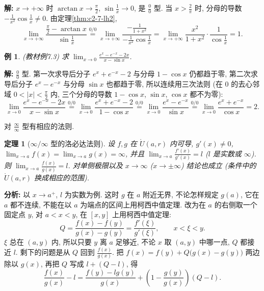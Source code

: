 \documentclass[UTF8,openany]{ctexbook}
\theoremstyle{chinesetextbook}
\newtheorem{example}{例}[section]
\newtheorem{theorem}{定理}[section]
\newenvironment{cnsolution}{\par\indent\textbf{解:} \ignorespaces}{\par}
\begin{document}
\begin{cnsolution}
$x\to+\infty$ 时 $\displaystyle\arctan x\to\frac\pi2$, $\displaystyle\sin\frac1x\to0$, 是 $\displaystyle\frac00$ 型. 当 $\displaystyle x>\frac2\pi$ 时, 分母的导数 $\displaystyle-\frac1{x^2}\cos\frac1x\ne0$. 由定理\ref{thm:c2-7-lh2},
\[
\lim_{x\to+\infty}\frac{\frac\pi2-\arctan x}{\sin\frac1x}\overset{0/0}{=}\lim_{x\to+\infty}\frac{-\frac1{1+x^2}}{-\frac1{x^2}\cos\frac1x}=\lim_{x\to+\infty}\frac{x^2}{1+x^2}\cdot\frac1{\cos\frac1x}=1.
\]
\end{cnsolution}
\begin{example}\label{ex:c2-7-3}
\textnormal{(教材例7.3)} 求 $\displaystyle\lim_{x\to0}\frac{e^x-e^{-x}-2x}{x-\sin x}$.
\end{example}
\begin{cnsolution}
$\displaystyle\frac00$ 型. 第一次求导后分子 $e^x+e^{-x}-2$ 与分母 $1-\cos x$ 仍都趋于零, 第二次求导后分子 $e^x-e^{-x}$ 与分母 $\sin x$ 也都趋于零, 所以连续用三次法则 (在 $0$ 的去心邻域 $\displaystyle0<|x|<\frac\pi2$ 内, 三个分母的导数 $1-\cos x$, $\sin x$, $\cos x$ 都不为零):
\[
\lim_{x\to0}\frac{e^x-e^{-x}-2x}{x-\sin x}\overset{0/0}{=}\lim_{x\to0}\frac{e^x+e^{-x}-2}{1-\cos x}\overset{0/0}{=}\lim_{x\to0}\frac{e^x-e^{-x}}{\sin x}\overset{0/0}{=}\lim_{x\to0}\frac{e^x+e^{-x}}{\cos x}=2.
\]
\end{cnsolution}
对 $\displaystyle\frac\infty\infty$ 型有相应的法则.
\begin{theorem}[$\infty/\infty$ 型的洛必达法则]\label{thm:c2-7-lh3}
设 $f,g$ 在 $\mathring U(a,r)$ 内可导, $g'(x)\ne0$, $\displaystyle\lim_{x\to a}f(x)=\lim_{x\to a}g(x)=\infty$, 并且 $\displaystyle\lim_{x\to a}\frac{f'(x)}{g'(x)}=l$ ($l$ 是实数或 $\infty$). 则 $\displaystyle\lim_{x\to a}\frac{f(x)}{g(x)}=l$. 对单侧极限以及 $x\to\infty$ ($x\to\pm\infty$) 结论也成立 (条件中的 $\mathring U(a,r)$ 换成相应的范围).
\end{theorem}
\par\indent\textbf{分析:} 以 $x\to a^+$, $l$ 为实数为例. 这时 $g$ 在 $a$ 附近无界, 不论怎样规定 $g(a)$, 它在 $a$ 都不连续, 不能在以 $a$ 为端点的区间上用柯西中值定理. 改为在 $a$ 的右侧取一个固定点 $y$, 对 $a<x<y$, 在 $[x,y]$ 上用柯西中值定理:
\[
Q=\frac{f(x)-f(y)}{g(x)-g(y)}=\frac{f'(\xi)}{g'(\xi)},\qquad x<\xi<y.
\]
$\xi$ 总在 $(a,y)$ 内, 所以只要 $y$ 离 $a$ 足够近, 不论 $x$ 取 $(a,y)$ 中哪一点, $Q$ 都接近 $l$. 剩下的问题是从 $Q$ 回到 $\displaystyle\frac{f(x)}{g(x)}$. 把 $f(x)=f(y)+Q\bigl(g(x)-g(y)\bigr)$ 两边除以 $g(x)$, 再把 $Q$ 写成 $l+(Q-l)$, 得
\[
\frac{f(x)}{g(x)}-l=\frac{f(y)-lg(y)}{g(x)}+\left(1-\frac{g(y)}{g(x)}\right)(Q-l).
\]
\end{document}
